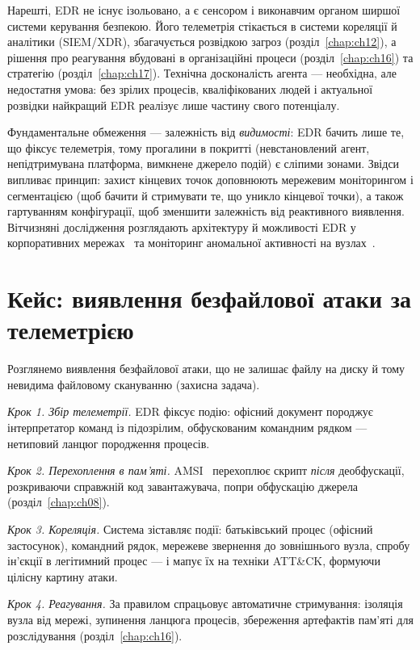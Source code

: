 Нарешті, EDR не існує ізольовано, а є сенсором і виконавчим органом ширшої системи керування безпекою. Його телеметрія стікається в системи кореляції й аналітики (SIEM/XDR), збагачується розвідкою загроз (розділ~\ref{chap:ch12}), а рішення про реагування вбудовані в організаційні процеси (розділ~\ref{chap:ch16}) та стратегію (розділ~\ref{chap:ch17}). Технічна досконалість агента --- необхідна, але недостатня умова: без зрілих процесів, кваліфікованих людей і актуальної розвідки найкращий EDR реалізує лише частину свого потенціалу.

Фундаментальне обмеження --- залежність від \emph{видимості}: EDR бачить лише те, що фіксує телеметрія, тому прогалини в покритті (невстановлений агент, непідтримувана платформа, вимкнене джерело подій) є сліпими зонами. Звідси випливає принцип: захист кінцевих точок доповнюють мережевим моніторингом і сегментацією (щоб бачити й стримувати те, що уникло кінцевої точки), а також гартуванням конфігурації, щоб зменшити залежність від реактивного виявлення. Вітчизняні дослідження розглядають архітектуру й можливості EDR у корпоративних мережах~\cite{ch10:edr-ua} та моніторинг аномальної активності на вузлах~\cite{ch10:monitor-ua}.

\section{Кейс: виявлення безфайлової атаки за телеметрією}\label{sec:ch10-case}

Розглянемо виявлення безфайлової атаки, що не залишає файлу на диску й тому невидима файловому скануванню (захисна задача).

\emph{Крок 1. Збір телеметрії.} EDR фіксує подію: офісний документ породжує інтерпретатор команд із підозрілим, обфускованим командним рядком --- нетиповий ланцюг породження процесів.

\emph{Крок 2. Перехоплення в пам'яті.} AMSI~\cite{ch10:amsi} перехоплює скрипт \emph{після} деобфускації, розкриваючи справжній код завантажувача, попри обфускацію джерела (розділ~\ref{chap:ch08}).

\emph{Крок 3. Кореляція.} Система зіставляє події: батьківський процес (офісний застосунок), командний рядок, мережеве звернення до зовнішнього вузла, спробу ін'єкції в легітимний процес --- і мапує їх на техніки ATT\&CK, формуючи цілісну картину атаки.

\emph{Крок 4. Реагування.} За правилом спрацьовує автоматичне стримування: ізоляція вузла від мережі, зупинення ланцюга процесів, збереження артефактів пам'яті для розслідування (розділ~\ref{chap:ch16}).

